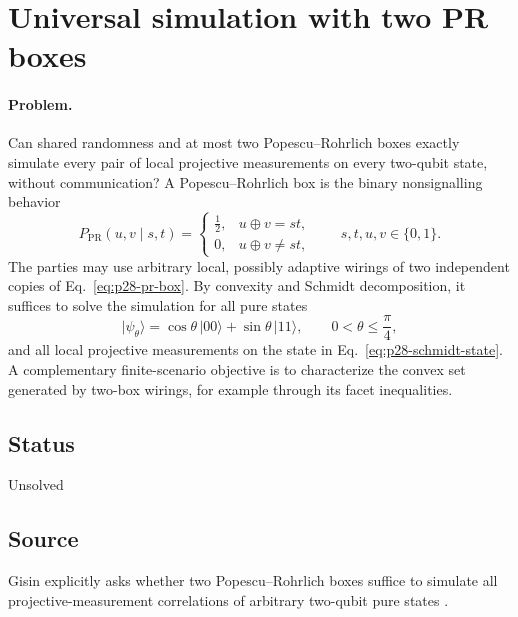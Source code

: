 \section{Universal simulation with two PR boxes}
\label{sec:op_452fc7d8cc44b728}

\paragraph{Problem.}
Can shared randomness and at most two Popescu--Rohrlich boxes exactly simulate
every pair of local projective measurements on every two-qubit state, without
communication?  A Popescu--Rohrlich box is the binary nonsignalling behavior
\begin{equation}
  P_{\mathrm{PR}}(u,v\mid s,t)
  =\begin{cases}
     \tfrac12,&u\oplus v=st,\\
     0,&u\oplus v\neq st,
   \end{cases}
  \qquad s,t,u,v\in\{0,1\}.
  \label{eq:p28-pr-box}
\end{equation}
The parties may use arbitrary local, possibly adaptive wirings of two
independent copies of Eq.~\eqref{eq:p28-pr-box}.  By convexity and Schmidt
decomposition, it suffices to solve the simulation for all pure states
\begin{equation}
  \lvert\psi_\theta\rangle
  =\cos\theta\,\lvert00\rangle+\sin\theta\,\lvert11\rangle,
  \qquad 0<\theta\leq\frac{\pi}{4},
  \label{eq:p28-schmidt-state}
\end{equation}
and all local projective measurements on the state in
Eq.~\eqref{eq:p28-schmidt-state}.  A complementary finite-scenario objective
is to characterize the convex set generated by two-box wirings, for example
through its facet inequalities.

\subsection*{Status}

Unsolved

\subsection*{Source}

Gisin explicitly asks whether two Popescu--Rohrlich boxes suffice to simulate
all projective-measurement correlations of arbitrary two-qubit pure states
.

